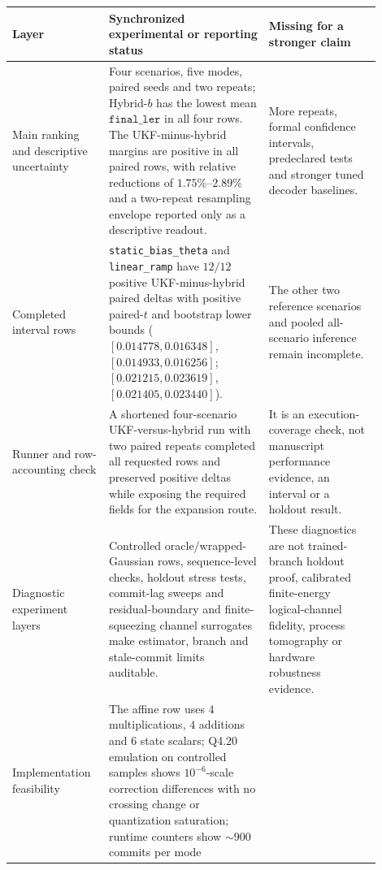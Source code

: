 \documentclass[11pt]{article}
\begin{document}
\begin{table}[ht]
\centering
\scriptsize
\setlength{\tabcolsep}{2.2pt}
\begin{tabular}{>{\raggedright\arraybackslash}p{0.22\linewidth}
                >{\raggedright\arraybackslash}p{0.40\linewidth}
                >{\raggedright\arraybackslash}p{0.28\linewidth}}
\toprule
Layer & Synchronized experimental or reporting status & Missing for a stronger claim \\
\midrule
Main ranking and descriptive uncertainty & Four scenarios, five modes, paired
seeds and two repeats; Hybrid-\(b\) has the lowest mean
\(\texttt{final\_ler}\) in all four rows.  The UKF-minus-hybrid margins are
positive in all paired rows, with relative reductions of
\(1.75\%\)--\(2.89\%\) and a two-repeat resampling envelope reported only as a
descriptive readout. & More repeats, formal confidence intervals,
predeclared tests and stronger tuned decoder baselines. \\
\addlinespace
Completed interval rows & \texttt{static\_bias\_theta} and
\texttt{linear\_ramp} have \(12/12\) positive UKF-minus-hybrid paired deltas
with positive paired-\(t\) and bootstrap lower bounds
(\([0.014778,0.016348]\), \([0.014933,0.016256]\);
\([0.021215,0.023619]\), \([0.021405,0.023440]\)). & The other two reference
scenarios and pooled all-scenario inference remain incomplete. \\
\addlinespace
Runner and row-accounting check & A shortened four-scenario UKF-versus-hybrid
run with two paired repeats completed all requested rows and preserved positive
deltas while exposing the required fields for the expansion route. & It is an
execution-coverage check, not manuscript performance evidence, an interval or a
holdout result. \\
\addlinespace
Diagnostic experiment layers & Controlled oracle/wrapped-Gaussian rows,
sequence-level checks, holdout stress tests, commit-lag sweeps and
residual-boundary and finite-squeezing channel surrogates make estimator,
branch and stale-commit limits auditable. & These diagnostics are not
trained-branch holdout proof, calibrated finite-energy logical-channel
fidelity, process tomography or hardware robustness evidence. \\
\addlinespace
Implementation feasibility & The affine row uses \(4\) multiplications,
\(4\) additions and \(6\) state scalars; Q4.20 emulation on controlled samples
shows \(10^{-6}\)-scale correction differences with no crossing change or
quantization saturation; runtime counters show \(\sim900\) commits per mode

\end{tabular}
\end{table}
\end{document}
